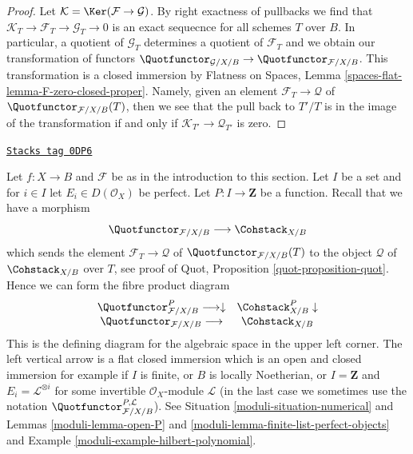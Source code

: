 \begin{proof}
Let $\mathcal{K} = \Ker(\mathcal{F} \to \mathcal{G})$. By right
exactness of pullbacks we find that
$\mathcal{K}_T \to \mathcal{F}_T \to \mathcal{G}_T \to 0$
is an exact sequecnce for all schemes $T$ over $B$.
In particular, a quotient of $\mathcal{G}_T$
determines a quotient of $\mathcal{F}_T$ and we obtain our transformation
of functors
$\Quotfunctor_{\mathcal{G}/X/B} \to \Quotfunctor_{\mathcal{F}/X/B}$.
This transformation is a closed immersion by
Flatness on Spaces, Lemma \ref{spaces-flat-lemma-F-zero-closed-proper}.
Namely, given an element $\mathcal{F}_T \to \mathcal{Q}$ of
$\Quotfunctor_{\mathcal{F}/X/B}(T)$, then we see that the pull
back to $T'/T$ is in the image of the transformation if and
only if $\mathcal{K}_{T'} \to \mathcal{Q}_{T'}$ is zero.
\end{proof}

\begin{remark}

\label{moduli-remark-quot-numerical}
\href{https://stacks.math.columbia.edu/tag/0DP6}{\texttt{Stacks tag 0DP6}}

Let $f : X \to B$ and $\mathcal{F}$ be as in the introduction to this section.
Let $I$ be a set and for $i \in I$ let $E_i \in D(\mathcal{O}_X)$ be perfect.
Let $P : I \to \mathbf{Z}$ be a function. Recall that we have a morphism
$$
\Quotfunctor_{\mathcal{F}/X/B} \longrightarrow \Cohstack_{X/B}
$$
which sends the element $\mathcal{F}_T \to \mathcal{Q}$
of $\Quotfunctor_{\mathcal{F}/X/B}(T)$ to the object $\mathcal{Q}$
of $\Cohstack_{X/B}$ over $T$, see proof of
Quot, Proposition \ref{quot-proposition-quot}. Hence we can form
the fibre product diagram
$$
\begin{array}{cc}\Quotfunctor^P_{\mathcal{F}/X/B} \longrightarrow\downarrow & \Cohstack^P_{X/B} \downarrow \\ \Quotfunctor_{\mathcal{F}/X/B} \longrightarrow & \Cohstack_{X/B}\end{array}
$$
This is the defining diagram for the algebraic space in the
upper left corner. The left vertical arrow is a
flat closed immersion which is an open and closed immersion
for example if $I$ is finite, or $B$ is locally Noetherian, or
$I = \mathbf{Z}$ and $E_i = \mathcal{L}^{\otimes i}$ for some
invertible $\mathcal{O}_X$-module $\mathcal{L}$ (in the last
case we sometimes use the notation
$\Quotfunctor^{P, \mathcal{L}}_{\mathcal{F}/X/B}$).
See Situation \ref{moduli-situation-numerical} and
Lemmas \ref{moduli-lemma-open-P} and \ref{moduli-lemma-finite-list-perfect-objects} and
Example \ref{moduli-example-hilbert-polynomial}.
\end{remark}

